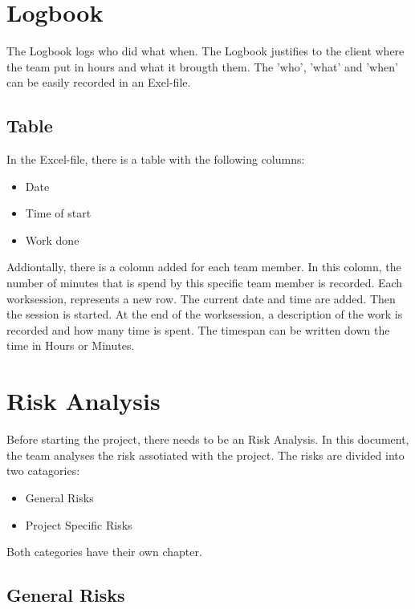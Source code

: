 \documentclass[10pt]{report}
\begin{document}
\newpage

\section{Logbook}

The Logbook logs who did what when. The Logbook justifies to the client where the team put in hours and what it brougth them. The 'who', 'what' and 'when' can be easily recorded in an Exel-file.

\subsection{Table}

In the Excel-file, there is a table with the following columns:

\begin{itemize}
	\item Date
	\item Time of start
	\item Work done
\end{itemize}

Addiontally, there is a colomn added for each team member. In this colomn, the number of minutes that is spend by this specific team member is recorded. Each worksession, represents a new row. The current date and time are added. Then the session is started. At the end of the worksession, a description of the work is recorded and how many time is spent. The timespan can be written down the time in Hours or Minutes.

\newpage

\section{Risk Analysis}

Before starting the project, there needs to be an Risk Analysis. In this document, the team analyses the risk assotiated with the project. The risks are divided into two catagories:

\begin{itemize}
	\item General Risks
	\item Project Specific Risks
\end{itemize}

Both categories have their own chapter.

\subsection{General Risks}
\end{document}
